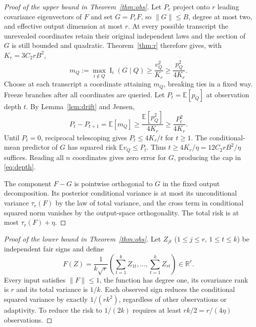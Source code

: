 \documentclass[11pt,letterpaper]{article}
\theoremstyle{definition}
\newcommand{\E}{\mathbb E}
\newcommand{\Inf}{\operatorname{I}}
\newcommand{\Ctwo}{C_2}
\newcommand{\norm}[1]{\lVert #1\rVert}
\begin{document}
\begin{proof}[Proof of the upper bound in Theorem~\ref{thm:obs}]
Let $P_r$ project onto $r$ leading covariance eigenvectors of $F$ and set $G=P_rF$, so $\norm G\le B$, degree at most two, and effective output dimension at most $r$. At every possible transcript the unrevealed coordinates retain their original independent laws and the section of $G$ is still bounded and quadratic. Theorem~\ref{thm:r} therefore gives, with $K_r=3\Ctwo rB^2$,
\[
m_Q:=\max_{i\notin Q}\Inf_i(G\mid Q)\ge\frac{v_Q^2}{K_r}\ge\frac{p_Q^2}{4K_r}.
\]
Choose at each transcript a coordinate attaining $m_Q$, breaking ties in a fixed way. Freeze branches after all coordinates are queried. Let $P_t=\E[p_Q]$ at observation depth $t$. By Lemma~\ref{lem:drift} and Jensen,
\begin{equation}\label{eq:recurrence}
P_t-P_{t+1}=\E[m_Q]\ge\frac{\E[p_Q^2]}{4K_r}\ge\frac{P_t^2}{4K_r}.
\end{equation}
Until $P_t=0$, reciprocal telescoping gives $P_t\le4K_r/t$ for $t\ge1$. The conditional-mean predictor of $G$ has squared risk $\E v_Q\le P_t$. Thus $t\ge4K_r/\eta=12\Ctwo rB^2/\eta$ suffices. Reading all $n$ coordinates gives zero error for $G$, producing the cap in \eqref{eq:depth}.

The component $F-G$ is pointwise orthogonal to $G$ in the fixed output decomposition. Its posterior conditional variance is at most its unconditional variance $\tau_r(F)$ by the law of total variance, and the cross term in conditional squared norm vanishes by the output-space orthogonality. The total risk is at most $\tau_r(F)+\eta$.
\end{proof}

\begin{proof}[Proof of the lower bound in Theorem~\ref{thm:obs}]
Let $Z_{jt}$ ($1\le j\le r$, $1\le t\le k$) be independent fair signs and define
\begin{equation}\label{eq:lower}
F(Z)=\frac1{k\sqrt r}\left(\sum_{t=1}^kZ_{1t},\ldots,\sum_{t=1}^kZ_{rt}\right)\in\mathbb R^r.
\end{equation}
Every input satisfies $\norm F\le1$, the function has degree one, its covariance rank is $r$ and its total variance is $1/k$. Each observed sign reduces the conditional squared variance by exactly $1/(rk^2)$, regardless of other observations or adaptivity. To reduce the risk to $1/(2k)$ requires at least $rk/2=r/(4\eta)$ observations.
\end{proof}
\end{document}
